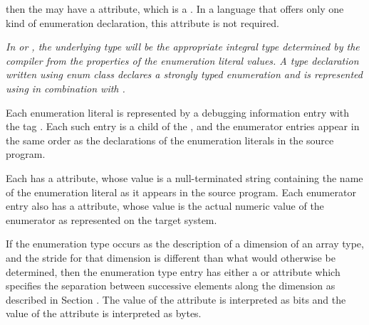 then the  may 
have a \DWATenumclassDEFN{}
attribute, which is a . 
In a language that offers only
one kind of enumeration declaration, this attribute is not
required.

\textit{In  or , 
the underlying type will be the appropriate
integral type determined by the compiler from the properties of
\hypertarget{chap:DWATenumclasstypesafeenumerationdefinition}{}
the enumeration literal values. 
A  type declaration written
using enum class declares a strongly typed enumeration and
is represented using \DWTAGenumerationtype{} 
in combination with \DWATenumclass.}

Each enumeration literal is represented by a debugging
information entry with the 
tag \DWTAGenumeratorTARG. 
Each
such entry is a child of the 
, and the
enumerator entries appear in the same order as the declarations
of the enumeration literals in the source program.

Each  has a \DWATname{} attribute, whose
value is a null-terminated string containing the name of the
\hypertarget{chap:DWATconstvalueenumerationliteralvalue}{}
enumeration literal as it appears in the source program. 
Each enumerator entry also has a 
\DWATconstvalueDEFN{} attribute,
whose value is the actual numeric value of the enumerator as
represented on the target system.

If the enumeration type occurs as the description of a
dimension of an array type, and the stride for that dimension
\hypertarget{chap:DWATbytestrideenumerationstridedimensionofarraytype}{}
is different than what would otherwise be determined, then
\hypertarget{chap:DWATbitstrideenumerationstridedimensionofarraytype}{}
the enumeration type entry has either a 
\DWATbytestrideDEFN{}
or \DWATbitstrideDEFN{} attribute 
which specifies the separation
between successive elements along the dimension as described
in 
Section . 
The value of the 
\DWATbitstride{} attribute
is interpreted as bits and the value of 
the 
\DWATbytestride{}
attribute is interpreted as bytes.


